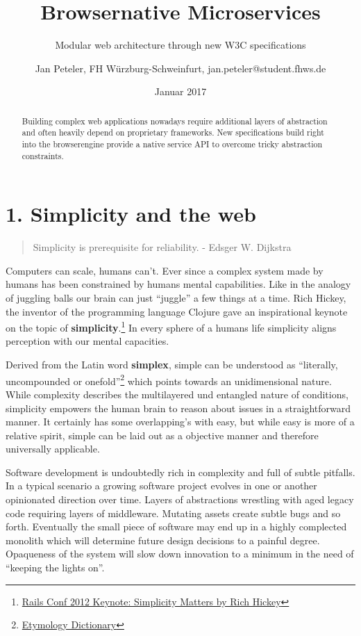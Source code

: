 \documentclass[]{article}
\title{Browsernative Microservices}
\subtitle{Modular web architecture through new W3C specifications}
\author{Jan Peteler, FH Würzburg-Schweinfurt, jan.peteler@student.fhws.de}
\date{Januar 2017}
\begin{document}
\maketitle
\begin{abstract}
Building complex web applications nowadays require additional layers of
abstraction and often heavily depend on proprietary frameworks. New
specifications build right into the browserengine provide a native
service API to overcome tricky abstraction constraints.
\end{abstract}

{
\setcounter{tocdepth}{3}
\tableofcontents
}
\section{1. Simplicity and the web}\label{simplicity-and-the-web}

\begin{quote}
Simplicity is prerequisite for reliability. - Edsger W. Dijkstra
\end{quote}

Computers can scale, humans can't. Ever since a complex system made by
humans has been constrained by humans mental capabilities. Like in the
analogy of juggling balls our brain can just ``juggle'' a few things at
a time. Rich Hickey, the inventor of the programming language Clojure
gave an inspirational keynote on the topic of
\textbf{simplicity}.\footnote{\href{https://www.youtube.com/watch?v=rI8tNMsozo0\&t=46s}{Rails
  Conf 2012 Keynote: Simplicity Matters by Rich Hickey}} In every sphere
of a humans life simplicity aligns perception with our mental
capacities.

Derived from the Latin word \textbf{simplex}, simple can be understood
as ``literally, uncompounded or onefold''\footnote{\href{http://www.etymonline.com/index.php?term=simple}{Etymology
  Dictionary}} which points towards an unidimensional nature. While
complexity describes the multilayered und entangled nature of
conditions, simplicity empowers the human brain to reason about issues
in a straightforward manner. It certainly has some overlapping's with
easy, but while easy is more of a relative spirit, simple can be laid
out as a objective manner and therefore universally applicable.

Software development is undoubtedly rich in complexity and full of
subtle pitfalls. In a typical scenario a growing software project
evolves in one or another opinionated direction over time. Layers of
abstractions wrestling with aged legacy code requiring layers of
middleware. Mutating assets create subtle bugs and so forth. Eventually
the small piece of software may end up in a highly complected monolith
which will determine future design decisions to a painful degree.
Opaqueness of the system will slow down innovation to a minimum in the
need of ``keeping the lights on''.
\end{document}

